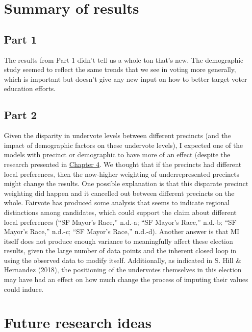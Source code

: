 \documentclass[12pt,twoside]{reedthesis}
\begin{document}
\hypertarget{summary-of-results}{%
\section{Summary of results}\label{summary-of-results}}

\hypertarget{part-1-1}{%
\subsection{Part 1}\label{part-1-1}}

The results from Part 1 didn't tell us a whole ton that's new. The demographic study seemed to reflect the same trends that we see in voting more generally, which is important but doesn't give any new input on how to better target voter education efforts.

\hypertarget{part-2-1}{%
\subsection{Part 2}\label{part-2-1}}

Given the disparity in undervote levels between different precincts (and the impact of demographic factors on these undervote levels), I expected one of the models with precinct or demographic to have more of an effect (despite the research presented in \protect\hyperlink{missing-litreview}{Chapter 4}. We thought that if the precincts had different local preferences, then the now-higher weighting of underrepresented precincts might change the results. One possible explanation is that this disparate precinct weighting did happen and it cancelled out between different precincts on the whole. Fairvote has produced some analysis that seems to indicate regional distinctions among candidates, which could support the claim about different local preferences (``SF Mayor's Race,'' n.d.-a; ``SF Mayor's Race,'' n.d.-b; ``SF Mayor's Race,'' n.d.-c; ``SF Mayor's Race,'' n.d.-d). Another answer is that MI itself does not produce enough variance to meaningfully affect these election results, given the large number of data points and the inherent closed loop in using the observed data to modify itself. Additionally, as indicated in S. Hill \& Hernandez (2018), the positioning of the undervotes themselves in this election may have had an effect on how much change the process of imputing their values could induce.

\hypertarget{future-research-ideas}{%
\section{Future research ideas}\label{future-research-ideas}}
\end{document}
